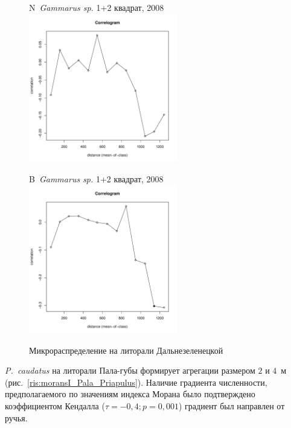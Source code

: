 \documentclass[12pt, a4paper]{disser}
\begin{document}
\begin{figure}[h]
	\begin{minipage}[b]{.46\linewidth}
	\begin{center}
	{\small N~{\it Gammarus sp.} 1+2 квадрат, 2008}
		\includegraphics[width=65mm]{../Barenc_Sea/distribution_Moran/Plyazh0812_moran_N_Gammarus_sp_.pdf}
	\end{center}
	\end{minipage}
%
	\hfil %
%
	\begin{minipage}[b]{.46\linewidth}
	\begin{center}
	{\small B~{\it Gammarus sp.} 1+2 квадрат, 2008}
		\includegraphics[width=65mm]{../Barenc_Sea/distribution_Moran/Plyazh0812_moran_B_Gammarus_sp_.pdf}
	\end{center}
	\end{minipage}
	\caption{Микрораспределение на литорали Дальнезеленецкой}
	\label{ris:moransI_DZ}
	\end{figure}


{\it P.~caudatus} на литорали Пала-губы формирует агрегации размером $2$ и $4$~м (рис.~\ref{ris:moransI_Pala_Priapulus}). 
Наличие градиента численности, предполагаемого по значениям индекса Морана было подтверждено коэффициентом Кендалла ($\tau = -0,4; p = 0,001$) \textemdash градиент был направлен от ручья.
\end{document}

